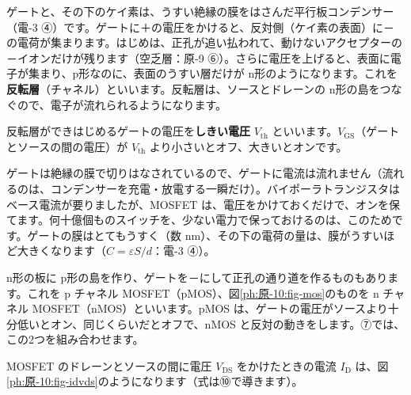 ゲートと、その下のケイ素は、うすい絶縁の膜をはさんだ平行板コンデンサー（電-3 ④）です。ゲートに＋の電圧をかけると、反対側（ケイ素の表面）に－の電荷が集まります。はじめは、正孔が追い払われて、動けないアクセプターの－イオンだけが残ります（空乏層：原-9 ⑥）。さらに電圧を上げると、表面に電子が集まり、p形なのに、表面のうすい層だけが n形のようになります。これを\textbf{反転層}（チャネル）といいます。反転層は、ソースとドレーンの n形の島をつなぐので、電子が流れられるようになります。

反転層ができはじめるゲートの電圧を\textbf{しきい電圧} $V_{\mathrm{th}}$ といいます。$V_{\mathrm{GS}}$（ゲートとソースの間の電圧）が $V_{\mathrm{th}}$ より小さいとオフ、大きいとオンです。

\begin{phmijika}
ゲートは絶縁の膜で切りはなされているので、ゲートに電流は流れません（流れるのは、コンデンサーを充電・放電する一瞬だけ）。バイポーラトランジスタはベース電流が要りましたが、MOSFET は、電圧をかけておくだけで、オンを保てます。何十億個ものスイッチを、少ない電力で保っておけるのは、このためです。ゲートの膜はとてもうすく（数 nm）、その下の電荷の量は、膜がうすいほど大きくなります（$C=\varepsilon S/d$：電-3 ④）。
\end{phmijika}

n形の板に p形の島を作り、ゲートを－にして正孔の通り道を作るものもあります。これを p チャネル MOSFET（pMOS）、図\ref{ph:原-10:fig-mos}のものを n チャネル MOSFET（nMOS）といいます。pMOS は、ゲートの電圧がソースより十分低いとオン、同じくらいだとオフで、nMOS と反対の動きをします。⑦では、この2つを組み合わせます。

\label{ph:原-10:sec5}
MOSFET のドレーンとソースの間に電圧 $V_{\mathrm{DS}}$ をかけたときの電流 $I_{\mathrm D}$ は、図\ref{ph:原-10:fig-idvds}のようになります（式は⑩で導きます）。

